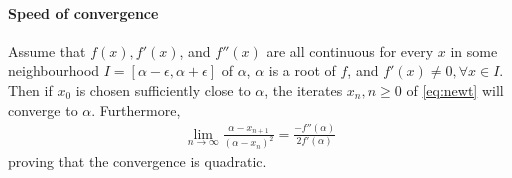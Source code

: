\documentclass[
  digital, %
  table,   %
  nolof,     %
  nolot,     %
	draft, %
]{fithesis3}
\begin{document}
\paragraph{Speed of convergence}
\begin{theorem}
  Assume that $f(x), f'(x)$, and $f''(x)$ are all continuous for every $x$ in some neighbourhood $I = [\alpha - \epsilon, \alpha + \epsilon]$ of $\alpha$, $\alpha$ is a root of $f$, and $f'(x) \neq 0, \forall x \in I$. Then if $x_{0}$ is chosen sufficiently close to $\alpha$, the iterates $x_{n}, n \geq 0$ of \eqref{eq:newt} will converge to $\alpha$. 
Furthermore,
\begin{align} 
 \lim_{n\to\infty} \frac{\alpha - x_{n+1}}{(\alpha - x_{n})^2} = \frac{-f''(\alpha)}{2f'(\alpha)}
\end{align}
proving that the convergence is quadratic.
\end{theorem}
\end{document}
